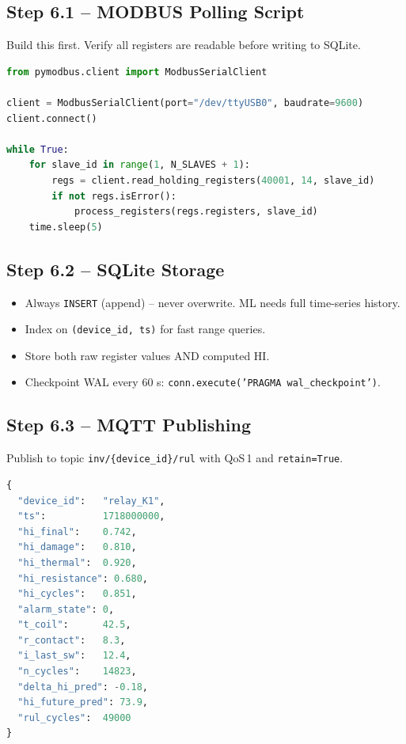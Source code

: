 \documentclass[12pt,a4paper]{article}
\begin{document}
\subsection{Step 6.1 -- MODBUS Polling Script}

Build this first. Verify all registers are readable before writing to SQLite.

\begin{lstlisting}[language=Python, caption={MODBUS poll script (core loop).}]
from pymodbus.client import ModbusSerialClient

client = ModbusSerialClient(port="/dev/ttyUSB0", baudrate=9600)
client.connect()

while True:
    for slave_id in range(1, N_SLAVES + 1):
        regs = client.read_holding_registers(40001, 14, slave_id)
        if not regs.isError():
            process_registers(regs.registers, slave_id)
    time.sleep(5)
\end{lstlisting}

\subsection{Step 6.2 -- SQLite Storage}

\begin{itemize}[noitemsep]
  \item Always \texttt{INSERT} (append) -- never overwrite. ML needs full time-series history.
  \item Index on \texttt{(device\_id, ts)} for fast range queries.
  \item Store both raw register values AND computed HI.
  \item Checkpoint WAL every 60 s: \texttt{conn.execute('PRAGMA wal\_checkpoint')}.
\end{itemize}

\subsection{Step 6.3 -- MQTT Publishing}

Publish to topic \texttt{inv/\{device\_id\}/rul} with QoS\,1 and \texttt{retain=True}.

\begin{lstlisting}[language=Python, caption={MQTT JSON payload format (inv/\{id\}/rul).}]
{
  "device_id":   "relay_K1",
  "ts":          1718000000,
  "hi_final":    0.742,
  "hi_damage":   0.810,
  "hi_thermal":  0.920,
  "hi_resistance": 0.680,
  "hi_cycles":   0.851,
  "alarm_state": 0,
  "t_coil":      42.5,
  "r_contact":   8.3,
  "i_last_sw":   12.4,
  "n_cycles":    14823,
  "delta_hi_pred": -0.18,
  "hi_future_pred": 73.9,
  "rul_cycles":  49000
}
\end{lstlisting}
\end{document}
